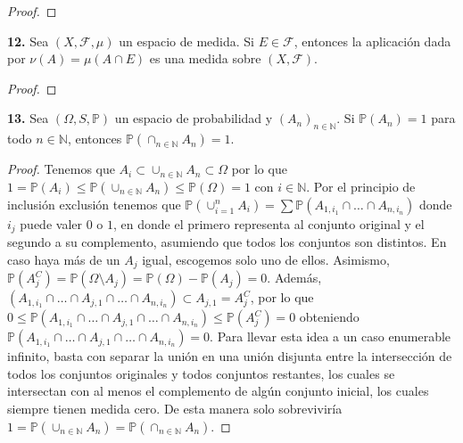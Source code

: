\documentclass{article}
\newenvironment{statement}[1]{\smallskip\noindent\color[rgb]{1.00,0.00,0.50} {\bf #1.}}{}
\theoremstyle{definition}
\theoremstyle{remark}
\newcommand{\BN}{\mathbb N}
\begin{document}
\begin{proof}
\end{proof}

\begin{statement}{12}
  Sea $(X, \mathcal{F}, \mu)$ un espacio de medida. Si $E \in \mathcal{F}$, entonces la aplicaci\'on dada por $\nu(A) = \mu(A \cap E)$ es una medida sobre $(X, \mathcal{F})$.
\end{statement}

\begin{proof}
\end{proof}

\begin{statement}{13}
  Sea $(\Omega, S, \mathbb{P})$ un espacio de probabilidad y $(A_n)_{n \in \BN}$. Si $\mathbb{P}(A_n) = 1$ para todo $n \in \BN$, entonces $\mathbb{P}(\cap_{n \in \BN} A_n) = 1$.
\end{statement}

\begin{proof}
  Tenemos que $A_i \subset \cup_{n \in \BN} A_n \subset \Omega$ por lo que $1 = \mathbb{P}(A_i) \leq \mathbb{P}(\cup_{n \in \BN} A_n) \leq \mathbb{P}(\Omega) = 1$ con $i \in \BN$.
  Por el principio de inclusi\'on exclusi\'on tenemos que $\mathbb{P}(\cup_{i = 1}^n A_i) = \sum \mathbb{P}(A_{1, i_1} \cap \dots \cap A_{n, i_n})$
  donde $i_j$ puede valer $0$ o $1$, en donde el primero representa al conjunto original y el segundo a su complemento, asumiendo que todos los conjuntos son distintos.
  En caso haya m\'as de un $A_j$ igual, escogemos solo uno de ellos.
  Asimismo, $\mathbb{P}(A_j^C) = \mathbb{P}(\Omega \setminus A_j) = \mathbb{P}(\Omega) - \mathbb{P}(A_j) = 0$.
  Adem\'as, $(A_{1, i_1} \cap \dots \cap A_{j, 1} \cap \dots \cap A_{n, i_n}) \subset A_{j, 1} = A_j^C$, por lo que
  $0 \leq \mathbb{P}(A_{1, i_1} \cap \dots \cap A_{j, 1} \cap \dots \cap A_{n, i_n}) \leq \mathbb{P}(A_j^C) = 0$ obteniendo
  $\mathbb{P}(A_{1, i_1} \cap \dots \cap A_{j, 1} \cap \dots \cap A_{n, i_n}) = 0$.
  Para llevar esta idea a un caso enumerable infinito, basta con separar la uni\'on en una uni\'on disjunta entre la intersecci\'on de todos los conjuntos originales y todos conjuntos restantes, los cuales se intersectan con al menos el complemento de alg\'un conjunto inicial, los cuales siempre tienen medida cero.
  De esta manera solo sobrevivir\'ia $1 = \mathbb{P}(\cup_{n \in \BN} A_n) = \mathbb{P}(\cap_{n \in \BN} A_n)$.
\end{proof}
\end{document}

